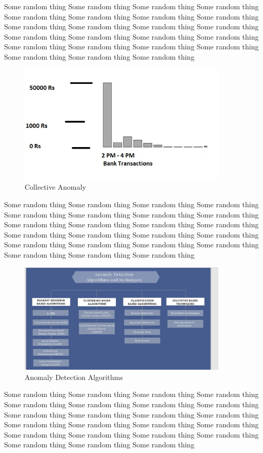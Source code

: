 Some random thing Some random thing Some random thing Some random thing Some random thing Some random thing Some random thing Some random thing Some random thing Some random thing Some random thing Some random thing Some random thing Some random thing Some random thing Some random thing Some random thing Some random thing Some random thing Some random thing Some random thing Some random thing Some random thing  
\begin{figure}[h]
	\centering
	\includegraphics[width=10cm]{texfiles/images/collective anomaly.jpg}
	\caption{Collective Anomaly \protect\cite{Historic96:online}}
	\label{fig:my_label}
\end{figure}


Some random thing Some random thing Some random thing Some random thing Some random thing Some random thing Some random thing Some random thing Some random thing Some random thing Some random thing Some random thing Some random thing Some random thing Some random thing Some random thing Some random thing Some random thing Some random thing Some random thing Some random thing Some random thing Some random thing  

\begin{figure}[h]
	\centering
	\includegraphics[width=10cm]{texfiles/images/anomaly-detection-algorithms.jpg}
	\caption{Anomaly Detection Algorithms \protect \cite{silviavalcheva} }
	\label{fig:my_label}
\end{figure}
Some random thing Some random thing Some random thing Some random thing Some random thing Some random thing Some random thing Some random thing Some random thing Some random thing Some random thing Some random thing Some random thing Some random thing Some random thing Some random thing Some random thing Some random thing Some random thing Some random thing Some random thing Some random thing Some random thing  

